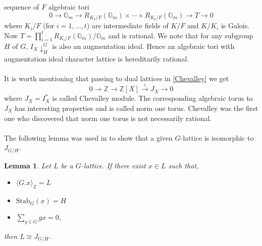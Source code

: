 \documentclass{article}
\theoremstyle{plain}
\newtheorem{lemma}[theorem]{Lemma}
\theoremstyle{definition}
\newcommand{\Z}{\ensuremath{\mathbb{Z}}}
\begin{document}
sequence of $F$ algebraic tori
$$0 \longrightarrow \mathbb{G}_m \longrightarrow R_{K_1/F}(\mathbb{G}_m) \times \cdots \times R_{K_t/F}(\mathbb{G}_m) \longrightarrow  T \longrightarrow 0$$
where $K_i/F$ (for $i = 1, \ldots ,t $) are intermediate fields of $K/F$ and $K/K_i$ is 
Galois. Now $T = \prod^t_{i = 1}R_{K_i/F}(\mathbb{G}_m)/\mathbb{G}_m$ and is rational. 
We note that for any subgroup $H$ of $G$, ${I_X}\downarrow^G_H$ is also an augmentation 
ideal. Hence an algebraic tori with augmentation ideal character lattice is hereditarily 
rational.\\
\\
It is worth mentioning that passing to dual lattices in \ref{Chevalley} we get 
$$0 \longrightarrow \Z \longrightarrow \Z [X] \overset{\varepsilon} \longrightarrow  J_{X} \longrightarrow 0$$
where $J_{X}= I^{\ast}_X$ is called Chevalley module. The corresponding algebraic 
torus to $J_X$ has interesting properties and is called norm one torus. Chevalley 
was the first one who discovered that norm one torus is not necessarily rational. \\
\\
The following lemma was used in \cite{Nicole1} to show that a given $G$-lattice 
is isomorphic to $J_{G/H}$.
\begin{lemma}\cite[Remark 4.1]{Nicole1}
Let $L$ be a $G$-lattice. If there exist $x\in L$ such that,
\begin{itemize}
\item $\langle G.x \rangle_{\Z} = L$
\item $\mathrm{Stab}_G(x) = H$
\item $\sum_{g \in G}gx = 0$,
\end{itemize}
then $L \cong J_{G/H}$.
\end{lemma}
\end{document}
